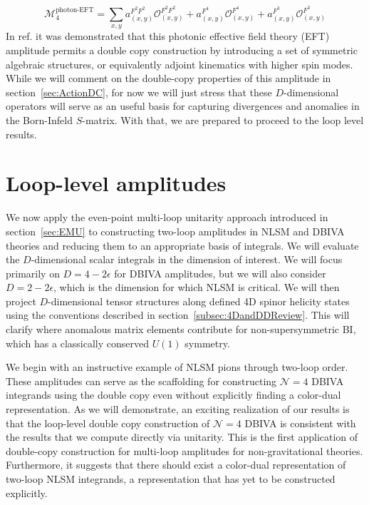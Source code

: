 \documentclass[12pt,letter]{article}
\def\sect#1{section~\ref{#1}}
\begin{document}
\begin{equation}
\boxed{\mathcal{M}^{\text{photon-EFT}}_4 = \sum_{x,y} a_{(x,y)}^{F^2F^2}\mathcal{O}^{F^2F^2}_{(x,y)}+a_{(x,y)}^{F^4}\mathcal{O}^{F^4}_{(x,y)}+a_{(x,y)}^{F^3}\mathcal{O}^{F^3}_{(x,y)}}
\end{equation}
In ref. \cite{Carrasco:2022jxn} it was demonstrated that this photonic effective field theory (EFT) amplitude permits a double copy construction by introducing a set of symmetric algebraic structures, or equivalently adjoint kinematics with higher spin modes. While we will comment on the double-copy properties of this amplitude in \sect{sec:ActionDC}, for now we will just stress that these $D$-dimensional operators will serve as an useful basis for capturing divergences and anomalies in the Born-Infeld $S$-matrix. With that, we are prepared to proceed to the loop level results. 

\section{Loop-level amplitudes}\label{sec:Loops}
We now apply the even-point multi-loop unitarity approach introduced in \sect{sec:EMU} to constructing two-loop amplitudes in NLSM and DBIVA theories and reducing them to an appropriate basis of integrals. We will evaluate the $D$-dimensional scalar integrals in the dimension of interest. We will focus primarily on $D=4-2\epsilon$ for DBIVA amplitudes, but we will also consider $D=2-2\epsilon$, which is the dimension for which NLSM is critical.   We will then project $D$-dimensional tensor structures along defined 4D spinor helicity states using the conventions described in \sect{subsec:4DandDDReview}. This will clarify where anomalous matrix elements contribute for non-supersymmetric BI, which has a classically conserved $U(1)$ symmetry. 


We begin with an instructive example of NLSM pions through two-loop order. These amplitudes can serve as the scaffolding for constructing $\mathcal{N}=4$ DBIVA integrands using the double copy even without explicitly finding a color-dual representation. As we will demonstrate, an exciting realization of our results is that the loop-level double copy construction of $\mathcal{N}=4$ DBIVA is consistent with the results that we compute directly via unitarity. This is the first application of double-copy construction for multi-loop amplitudes for non-gravitational theories. Furthermore, it suggests that there should exist a color-dual representation of two-loop NLSM integrands, a representation that has yet to be constructed explicitly. 
\end{document}
